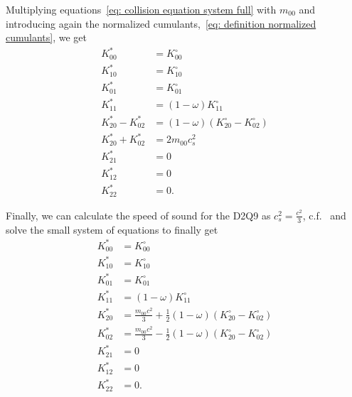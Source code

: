 Multiplying equations~\eqref{eq: collision equation system full} with $m_{00}$ and introducing again the normalized cumulants,~\eqref{eq: definition normalized cumulants}, we get
\begin{equation*}
  \begin{aligned}
    K_{00}^{*} & = K_{00}^{\circ}\\
    K_{10}^{*} & = K_{10}^{\circ}\\
    K_{01}^{*} & = K_{01}^{\circ}\\
    K_{11}^{*} & = (1-\omega)K_{11}^{\circ}\\
    K_{20}^{*} - K_{02}^{*} & = (1-\omega) (K_{20}^{\circ}- K_{02}^{\circ}) \\
    K_{20}^{*} + K_{02}^{*} & = 2 m_{00} c_s^2 \\
    K_{21}^{*} & = 0 \\
    K_{12}^{*} & = 0 \\
    K_{22}^{*} & = 0.
  \end{aligned}
\end{equation*}

Finally, we can calculate the speed of sound for the D2Q9 as $c_s^2=\frac{c^2}{3}$, c.f.~\cite[page 175]{wolf2000lattice} and solve the small system of equations to finally get
\begin{equation}
  \label{eq: final collision one relaxation}
  \begin{aligned}
    K_{00}^{*} & = K_{00}^{\circ}\\
    K_{10}^{*} & = K_{10}^{\circ}\\
    K_{01}^{*} & = K_{01}^{\circ}\\
    K_{11}^{*} & = (1-\omega)K_{11}^{\circ}\\
    K_{20}^{*} & = \frac{m_{00}c^2}{3} + \frac{1}{2}(1-\omega) (K_{20}^{\circ}- K_{02}^{\circ}) \\
    K_{02}^{*} & = \frac{m_{00}c^2}{3} - \frac{1}{2}(1-\omega) (K_{20}^{\circ}- K_{02}^{\circ}) \\
    K_{21}^{*} & = 0 \\
    K_{12}^{*} & = 0 \\
    K_{22}^{*} & = 0.
  \end{aligned}
\end{equation}
